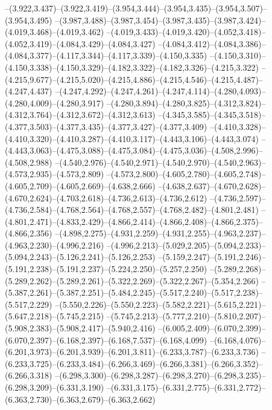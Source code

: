   --(3.922,3.437)--(3.922,3.419)--(3.954,3.444)--(3.954,3.435)--(3.954,3.507)--(3.954,3.495)%
  --(3.987,3.488)--(3.987,3.454)--(3.987,3.435)--(3.987,3.424)--(4.019,3.468)--(4.019,3.462)%
  --(4.019,3.433)--(4.019,3.420)--(4.052,3.418)--(4.052,3.419)--(4.084,3.429)--(4.084,3.427)%
  --(4.084,3.412)--(4.084,3.386)--(4.084,3.377)--(4.117,3.344)--(4.117,3.339)--(4.150,3.335)%
  --(4.150,3.310)--(4.150,3.338)--(4.150,3.329)--(4.182,3.322)--(4.182,3.326)--(4.215,3.322)%
  --(4.215,9.677)--(4.215,5.020)--(4.215,4.886)--(4.215,4.546)--(4.215,4.487)--(4.247,4.437)%
  --(4.247,4.292)--(4.247,4.261)--(4.247,4.114)--(4.280,4.093)--(4.280,4.009)--(4.280,3.917)%
  --(4.280,3.894)--(4.280,3.825)--(4.312,3.824)--(4.312,3.764)--(4.312,3.672)--(4.312,3.613)%
  --(4.345,3.585)--(4.345,3.518)--(4.377,3.503)--(4.377,3.435)--(4.377,3.427)--(4.377,3.409)%
  --(4.410,3.328)--(4.410,3.320)--(4.410,3.287)--(4.410,3.117)--(4.443,3.106)--(4.443,3.074)%
  --(4.443,3.063)--(4.475,3.088)--(4.475,3.084)--(4.475,3.036)--(4.508,2.996)--(4.508,2.988)%
  --(4.540,2.976)--(4.540,2.971)--(4.540,2.970)--(4.540,2.963)--(4.573,2.935)--(4.573,2.809)%
  --(4.573,2.800)--(4.605,2.780)--(4.605,2.748)--(4.605,2.709)--(4.605,2.669)--(4.638,2.666)%
  --(4.638,2.637)--(4.670,2.628)--(4.670,2.624)--(4.703,2.618)--(4.736,2.613)--(4.736,2.612)%
  --(4.736,2.597)--(4.736,2.584)--(4.768,2.564)--(4.768,2.557)--(4.768,2.482)--(4.801,2.481)%
  --(4.801,2.471)--(4.833,2.429)--(4.866,2.414)--(4.866,2.408)--(4.866,2.375)--(4.866,2.356)%
  --(4.898,2.275)--(4.931,2.259)--(4.931,2.255)--(4.963,2.237)--(4.963,2.230)--(4.996,2.216)%
  --(4.996,2.213)--(5.029,2.205)--(5.094,2.233)--(5.094,2.243)--(5.126,2.241)--(5.126,2.253)%
  --(5.159,2.247)--(5.191,2.246)--(5.191,2.238)--(5.191,2.237)--(5.224,2.250)--(5.257,2.250)%
  --(5.289,2.268)--(5.289,2.262)--(5.289,2.261)--(5.322,2.269)--(5.322,2.267)--(5.354,2.266)%
  --(5.387,2.261)--(5.387,2.251)--(5.484,2.245)--(5.517,2.240)--(5.517,2.238)--(5.517,2.229)%
  --(5.550,2.226)--(5.550,2.223)--(5.582,2.221)--(5.615,2.221)--(5.647,2.218)--(5.745,2.215)%
  --(5.745,2.213)--(5.777,2.210)--(5.810,2.207)--(5.908,2.383)--(5.908,2.417)--(5.940,2.416)%
  --(6.005,2.409)--(6.070,2.399)--(6.070,2.397)--(6.168,2.397)--(6.168,7.537)--(6.168,4.099)%
  --(6.168,4.076)--(6.201,3.973)--(6.201,3.939)--(6.201,3.811)--(6.233,3.787)--(6.233,3.736)%
  --(6.233,3.725)--(6.233,3.484)--(6.266,3.469)--(6.266,3.381)--(6.266,3.352)--(6.266,3.318)%
  --(6.298,3.300)--(6.298,3.287)--(6.298,3.270)--(6.298,3.235)--(6.298,3.209)--(6.331,3.190)%
  --(6.331,3.175)--(6.331,2.775)--(6.331,2.772)--(6.363,2.730)--(6.363,2.679)--(6.363,2.662)%
